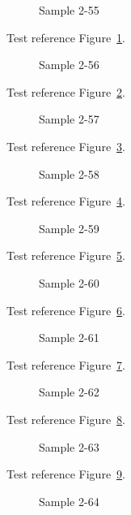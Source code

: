 \begin{figure}[tbhp]
\caption{Sample 2-55}
\label{fig:sample-2-55}
\end{figure}

Test reference Figure~\ref{fig:sample-2-55}.

\begin{figure}[tbhp]
\caption{Sample 2-56}
\label{fig:sample-2-56}
\end{figure}

Test reference Figure~\ref{fig:sample-2-56}.

\begin{figure}[tbhp]
\caption{Sample 2-57}
\label{fig:sample-2-57}
\end{figure}

Test reference Figure~\ref{fig:sample-2-57}.

\begin{figure}[tbhp]
\caption{Sample 2-58}
\label{fig:sample-2-58}
\end{figure}

Test reference Figure~\ref{fig:sample-2-58}.

\begin{figure}[tbhp]
\caption{Sample 2-59}
\label{fig:sample-2-59}
\end{figure}

Test reference Figure~\ref{fig:sample-2-59}.

\begin{figure}[tbhp]
\caption{Sample 2-60}
\label{fig:sample-2-60}
\end{figure}

Test reference Figure~\ref{fig:sample-2-60}.

\begin{figure}[tbhp]
\caption{Sample 2-61}
\label{fig:sample-2-61}
\end{figure}

Test reference Figure~\ref{fig:sample-2-61}.

\begin{figure}[tbhp]
\caption{Sample 2-62}
\label{fig:sample-2-62}
\end{figure}

Test reference Figure~\ref{fig:sample-2-62}.

\begin{figure}[tbhp]
\caption{Sample 2-63}
\label{fig:sample-2-63}
\end{figure}

Test reference Figure~\ref{fig:sample-2-63}.

\begin{figure}[tbhp]
\caption{Sample 2-64}
\label{fig:sample-2-64}
\end{figure}

